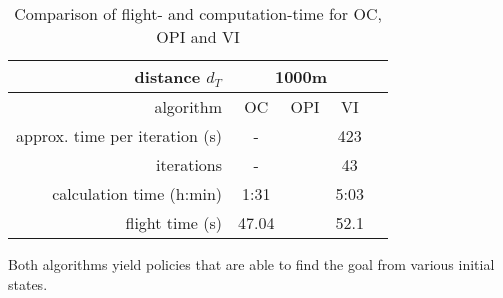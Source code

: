 \begin{table}[h]
	\begin{center}
		\begin{tabular}{r|c c c c}
			distance $d_T$ & \multicolumn{3}{c}{1000m} \\ \hline 
			algorithm & OC & OPI & VI \\
			approx. time per iteration (s) & - & & 423 \\
			iterations & - &  & 43 \\
			calculation time (h:min) & 1:31 & & 5:03 \\
			flight time (s) & 47.04  & & 52.1
		\end{tabular}
		\caption{Comparison of flight- and computation-time for OC, OPI and VI}
		\label{tab:2d_flight_data_1000m}
	\end{center}
\end{table}

Both algorithms yield policies that are able to find the goal from various initial states. 

